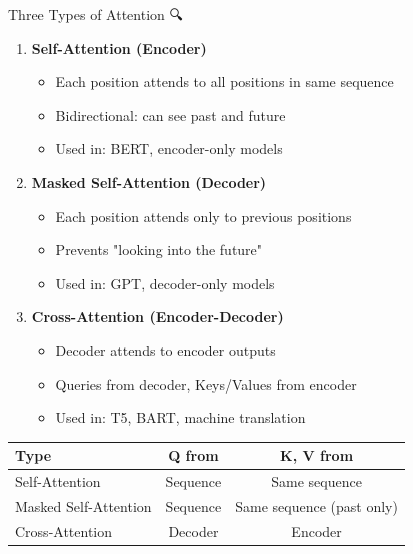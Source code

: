 \documentclass[aspectratio=169]{beamer}
\begin{document}
\begin{frame}[shrink=10]{Three Types of Attention 🔍}
\begin{enumerate}\setlength{\itemsep}{0pt}
    \item \textbf{Self-Attention (Encoder)}
    \begin{itemize}\setlength{\itemsep}{0pt}
        \item Each position attends to all positions in same sequence
        \item Bidirectional: can see past and future
        \item Used in: BERT, encoder-only models
    \end{itemize}

    \vspace{0.5em}

    \item \textbf{Masked Self-Attention (Decoder)}
    \begin{itemize}\setlength{\itemsep}{0pt}
        \item Each position attends only to previous positions
        \item Prevents "looking into the future"
        \item Used in: GPT, decoder-only models
    \end{itemize}

    \vspace{0.5em}

    \item \textbf{Cross-Attention (Encoder-Decoder)}
    \begin{itemize}\setlength{\itemsep}{0pt}
        \item Decoder attends to encoder outputs
        \item Queries from decoder, Keys/Values from encoder
        \item Used in: T5, BART, machine translation
    \end{itemize}
\end{enumerate}

\vspace{1em}

\begin{center}
\begin{tabular}{lcc}
\toprule
\textbf{Type} & \textbf{Q from} & \textbf{K, V from} \\
\midrule
Self-Attention & Sequence & Same sequence \\
Masked Self-Attention & Sequence & Same sequence (past only) \\
Cross-Attention & Decoder & Encoder \\
\bottomrule
\end{tabular}
\end{center}
\end{frame}
\end{document}
